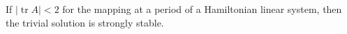If $|\operatorname{tr} A| < 2$ for the mapping at a period of a Hamiltonian linear system, then the trivial solution is strongly stable.
